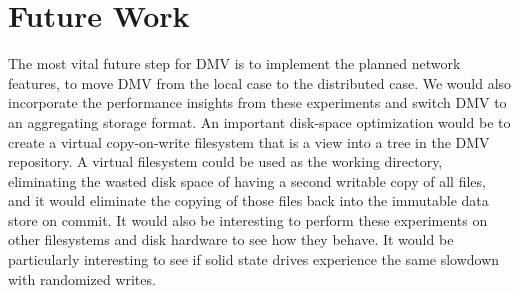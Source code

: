 \section{Future Work}

The most vital future step for DMV is to implement the planned network features, to move DMV from the local case to the distributed case.
We would also incorporate the performance insights from these experiments and switch DMV to an aggregating storage format.
An important disk-space optimization would be to create a virtual copy-on-write filesystem that is a view into a \gls{tree} in the \gls{DMV} repository.
A virtual filesystem could be used as the working directory, eliminating the wasted disk space of having a second writable copy of all files, and it would eliminate the copying of those files back into the immutable data store on \gls{commit}.
It would also be interesting to perform these experiments on other filesystems and disk hardware to see how they behave.
It would be particularly interesting to see if solid state drives experience the same slowdown with randomized writes.
